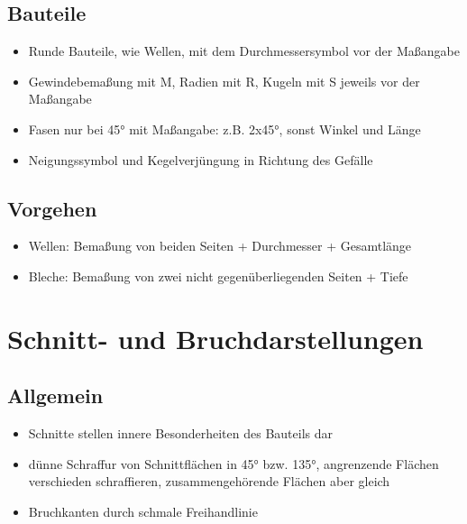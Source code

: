 \documentclass[a4paper,parskip=half*,DIV=7,fontsize=11pt]{scrartcl}
\begin{document}
\subsection{Bauteile}
\begin{itemize}
	\item Runde Bauteile, wie Wellen, mit dem Durchmessersymbol vor der Maßangabe
	\item Gewindebemaßung mit M, Radien mit R, Kugeln mit S jeweils vor der Maßangabe
	\item Fasen nur bei 45° mit Maßangabe: z.B. 2x45°, sonst Winkel und Länge
	\item Neigungssymbol und Kegelverjüngung in Richtung des Gefälle
\end{itemize}

\subsection{Vorgehen}
\begin{itemize}
	\item Wellen: Bemaßung von beiden Seiten + Durchmesser + Gesamtlänge
	\item Bleche: Bemaßung von zwei nicht gegenüberliegenden Seiten + Tiefe
\end{itemize}
	
	
\section{Schnitt- und Bruchdarstellungen}
\subsection{Allgemein}
\begin{itemize}
	\item Schnitte stellen innere Besonderheiten des Bauteils dar
	\item dünne Schraffur von Schnittflächen in 45° bzw. 135°, angrenzende Flächen verschieden schraffieren, zusammengehörende Flächen aber gleich
	\item Bruchkanten durch schmale Freihandlinie
\end{itemize}
		
\end{document}

